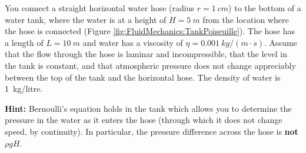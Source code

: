 \question You connect a straight horizontal water hose (radius $r=\SI{1}{cm}$) to the bottom of a water tank, where the water is at a height of $H=\SI{5}{m}$ from the location where the hose is connected (Figure \ref{fig:FluidMechanics:TankPoiseuille}). The hose has a length of $L=\SI{10}{m}$ and water has a viscosity of $\eta = \SI{0.001}{kg/(m\cdot s)}$. Assume that the flow through the hose is laminar and incompressible, that the level in the tank is constant, and that atmospheric pressure does not change appreciably between the top of the tank and the horizontal hose. The density of water is \SI{1}{kg/litre}.

\textbf{Hint:} Bernoulli's equation holds in the tank which allows you to determine the pressure in the water as it enters the hose (through which it does not change speed, by continuity). In particular, the pressure difference across the hose is \textbf{not} $\rho g H$.


\begin{finalanswer}
\end{finalanswer}

